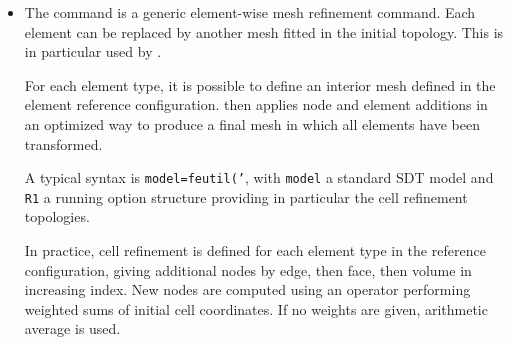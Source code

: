 
\begin{itemize}

\item The  command is a generic element-wise mesh refinement command. Each element can be replaced by another mesh fitted in the initial topology. This is in particular used by .

For each element type, it is possible to define an interior mesh defined in the element reference configuration.  then applies node and element additions in an optimized way to produce a final mesh in which all elements have been transformed.

A typical syntax is {\tt model=feutil('}, with {\tt model} a standard SDT model and {\tt R1} a running option structure providing in particular the cell refinement topologies.

In practice, cell refinement is defined for each element type in the reference configuration, giving additional nodes by edge, then face, then volume in increasing index. New nodes are computed using an operator performing weighted sums of initial cell coordinates. If no weights are given, arithmetic average is used.


\end{itemize}
